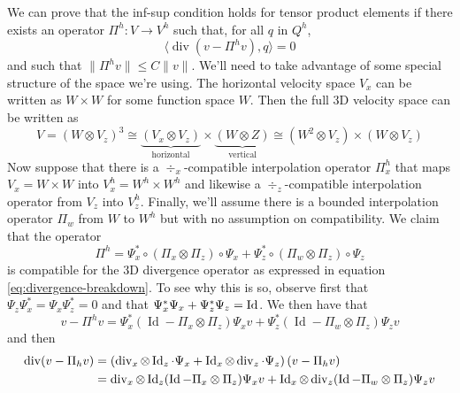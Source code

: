 \documentclass{article}
\theoremstyle{definition}
\theoremstyle{plain}
\renewcommand{\div}[1]{\operatorname{div} #1} %
\newcommand{\Id}[1]{\operatorname{Id} #1}
\begin{document}
We can prove that the inf-sup condition holds for tensor product elements if there exists an operator $\Pi^h : V \to V^h$ such that, for all $q$ in $Q^h$,
\begin{equation}
    \langle \div(v - \Pi^hv), q\rangle = 0
\end{equation}
and such that $\|\Pi^hv\| \le C\|v\|$.
We'll need to take advantage of some special structure of the space we're using.
The horizontal velocity space $V_x$ can be written as $W \times W$ for some function space $W$.
Then the full 3D velocity space can be written as
\begin{equation}
    V = (W \otimes V_z)^3 \cong \underbrace{(V_x \otimes V_z)}_{\text{horizontal}} \times \underbrace{(W \otimes Z)}_{\text{vertical}} \cong (W^2 \otimes V_z) \times (W \otimes V_z)
\end{equation}
Now suppose that there is a $\div_x$-compatible interpolation operator $\Pi^h_x$ that maps $V_x = W \times W$ into $V^h_x = W^h \times W^h$ and likewise a $\div_z$-compatible interpolation operator from $V_z$ into $V_z^h$.
Finally, we'll assume there is a bounded interpolation operator $\Pi_w$ from $W$ to $W^h$ but with no assumption on compatibility.
We claim that the operator
\begin{equation}
    \Pi^h = \Psi_x^*\circ(\Pi_x\otimes\Pi_z)\circ\Psi_x + \Psi_z^*\circ(\Pi_w\otimes\Pi_z)\circ\Psi_z
\end{equation}
is compatible for the 3D divergence operator as expressed in equation \eqref{eq:divergence-breakdown}.
To see why this is so, observe first that $\Psi_z\Psi_x^* = \Psi_x\Psi_z^* = 0$ and that $\Psi_x^*\Psi_x + \Psi_z^*\Psi_z = \Id$.
We then have that
\begin{equation}
    v - \Pi^h v = \Psi_x^*(\Id - \Pi_x\otimes\Pi_z)\Psi_x v + \Psi_z^*(\Id - \Pi_w\otimes\Pi_z)\Psi_z v
\end{equation}
and then
\begin{align}
    \div(v - \Pi_h v) & = \left(\div_x\otimes\Id_z\cdot\Psi_x + \Id_x\otimes\div_z\cdot\Psi_z\right)(v - \Pi_h v) \\
    & = \div_x\otimes\Id_z(\Id - \Pi_x\otimes\Pi_z)\Psi_x v + \Id_x\otimes\div_z(\Id - \Pi_w\otimes\Pi_z)\Psi_z v
\end{align}

\pagebreak



\end{document}
